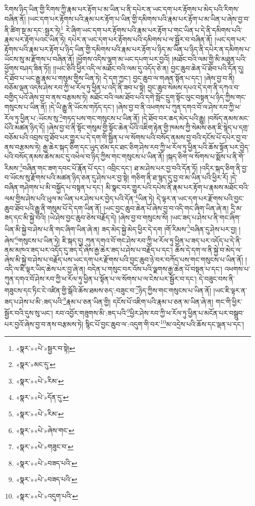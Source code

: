 རིགས་ཉིད་ཡིན་གྱི་རིགས་ཀྱི་རྣམ་པར་རྟོག་པ་མ་ཡིན་པ་ནི་དཔེར་ན་ཡང་དག་པར་རྟོགས་པ་མེད་པའི་རིགས་བཞིན་ནོ། །ཡང་དག་པར་རྟོགས་པའི་རྣམ་པར་རྟོག་པ་ཡིན་གྱི་དམིགས་པའི་རྣམ་པར་རྟོག་པ་མ་ཡིན་པ་ཞེས་བྱ་བ་ནི་ཚིག་སྔ་མ་དང་:སྦྱར་ཏེ།\footnote{«སྣར་»«པེ་»སྦྱར་བ་སྟེ།} རེ་ཞིག་ཡང་དག་པར་རྟོགས་པའི་རྣམ་པར་རྟོག་པ་གང་ཡིན་པ་དེ་ནི་དམིགས་པའི་རྣམ་པར་རྟོག་པའང་ཡིན་ཏེ། དཔེར་ན་ཡང་དག་པར་རྟོགས་པའི་དམིགས་པ་ལ་སྦྱོར་བ་བཞིན་ནོ། །ཡང་དག་པར་རྟོགས་པའི་རྣམ་པར་རྟོག་པ་ཉིད་ཡིན་གྱི་དམིགས་པའི་རྣམ་པར་རྟོག་པ་ཉིད་མ་ཡིན་པ་ཉིད་ནི་དཔེར་ན་དམིགས་པ་ཡོངས་སུ་མ་རྫོགས་པ་བཞིན་ནོ། །ཕྱོགས་འདིས་ལྷག་མ་ཡང་དཔག་པར་བྱའོ། །མཐོང་བའི་ལམ་གྱི་མི་མཐུན་པའི་ཕྱོགས་བཤད་ཟིན་ཏོ།། །།ཡང་ཅིའི་ཕྱིར་འདི་ལ་མཐོང་བའི་ལམ་དུ་འདོད་ཅེ་ན། བྱང་ཆུབ་ཆེན་པོ་ཐོབ་པའི་དོན་དུ། དེ་ཐོབ་པ་ཡང་རྒྱུ་རྣམ་པ་གསུམ་གྱིས་ཡིན་ཏེ། དེ་དག་ཀྱང་། བྱང་ཆུབ་ལ་གཞན་སྟོན་པ་དང་། །ཞེས་བྱ་བ་ནི། བཅོམ་ལྡན་འདས་ཤེས་རབ་ཀྱི་ཕ་རོལ་ཏུ་ཕྱིན་པ་འདི་ནི་ཟབ་པ་སྟེ། བྱང་ཆུབ་སེམས་དཔའ་དེ་དག་ནི་དཀའ་བ་བགྱིད་པའོ་ཞེས་བྱ་བ་ནས་བརྩམས་ཏེ། མཐོང་བའི་ལམ་ཐོབ་པའི་དགེ་སློང་དྲུག་སྟོང་ལུང་བསྟན་པ་ཉིད་ཀྱིས་གང་གསུངས་པ་ཡིན་ནོ། །དེ་ཡི་རྒྱུ་ནི་ཡོངས་གཏོད་དང་། །ཞེས་བྱ་བ་ནི་འཕགས་པ་ཀུན་དགའ་བོ་ལ་ཤེས་རབ་ཀྱི་ཕ་རོལ་ཏུ་ཕྱིན་པ་:ཡོངས་སུ་\footnote{«སྣར་»མང་དུ་}གཏད་པས་གང་གསུངས་པ་ཡིན་ནོ། །དེ་ཐོབ་བར་ཆད་མེད་པའི་རྒྱུ། །བསོད་ནམས་མང་པོའི་མཚན་ཉིད་དོ། །ཞེས་བྱ་བ་ནི་སྟོང་གསུམ་གྱི་སྟོང་ཆེན་པོའི་འཇིག་རྟེན་གྱི་ཁམས་ཀྱི་སེམས་ཅན་ཇི་སྙེད་པ་དགྲ་བཅོམ་པའི་འབྲས་བུ་ཐོབ་པར་གྱུར་པ་དེ་དག་གི་སྦྱིན་པ་ལ་སོགས་པའི་བསོད་ནམས་བྱ་བའི་དངོས་པོ་དཔེར་བྱ་བ་ནས་བརྩམས་ཏེ། རྒྱ་ཆེར་སྐད་ཅིག་དང་ཡུད་ཙམ་དང་ཐང་ཅིག་ཤེས་རབ་ཀྱི་ཕ་རོལ་ཏུ་ཕྱིན་པའི་ཆོས་སྟོན་པར་བྱེད་པའི་བསོད་ནམས་ཆེས་མང་དུ་འཕེལ་བ་ཉིད་ཀྱིས་གང་གསུངས་པ་ཡིན་ནོ། །སྐད་ཅིག་ལ་སོགས་པ་སྨོས་པ་ནི་གོ་རིམས་\footnote{«སྣར་»«པེ་»རིམ་}བཞིན་གང་ཟག་དབང་པོ་རྣོན་པོ་དང་། འབྲིང་དང་། ཐ་མ་ཤེས་པར་བྱ་བའི་དོན་ཏོ། །འདིར་སྐད་ཅིག་ནི་བྱ་བ་ཡོངས་སུ་རྫོགས་པའི་མཚན་ཉིད་ཅན་དུ་ཤེས་པར་བྱ་སྟེ། གཅིག་ནི་ཐ་སྙད་དུ་བྱ་བ་མ་ཡིན་པའི་ཕྱིར་རོ། །དེ་བཞིན་གཤེགས་པ་མི་བསྐྱོད་པ་བསྟན་པ་དང་། མི་སྣང་བར་གྱུར་པའི་དཔེས་ནི་རྣམ་པར་རྟོག་པ་རྣམས་མཐོང་བའི་ལམ་གྱིས་ཤེས་པའི་ཡུལ་མ་ཡིན་པར་ཤེས་པར་བྱེད་པའི་དོན་\footnote{«སྣར་»«པེ་»དོན་དུ་}ཡིན་ཏེ། དེ་ལྟར་ན་ཡང་དག་པར་རྫོགས་པའི་བྱང་ཆུབ་ཐོབ་པའི་རྒྱུ་ནི་གསུམ་པོ་དེ་དག་ཡིན་ནོ། །ཡང་བྱང་ཆུབ་ཆེན་པོ་ཞེས་བྱ་བ་འདི་གང་ཞིག་ཡིན་ཞེ་ན། དྲི་མ་ཟད་དང་མི་སྐྱེ་བའི། །ཡེ་ཤེས་བྱང་ཆུབ་ཅེས་བརྗོད་དེ། །ཞེས་བྱ་བ་གསུངས་སོ། །ཡང་ཟད་པ་ཤེས་པ་ནི་གང་ཞིག་ཡིན་མི་སྐྱེ་བ་ཤེས་པ་ནི་གང་ཞིག་ཡིན་ཞེ་ན། ཟད་མེད་སྐྱེ་མེད་ཕྱིར་དེ་དག །གོ་རིམས་\footnote{«སྣར་»«པེ་»རིམ་}བཞིན་དུ་ཤེས་པར་བྱ། །ཞེས་\footnote{«སྣར་»«པེ་»ཞེས་གང་}གསུངས་པ་ཡིན་ཏེ། ཇི་སྐད་དུ། ཀུན་དགའ་བོ་གང་ཤེས་རབ་ཀྱི་ཕ་རོལ་ཏུ་ཕྱིན་པ་ཟད་པར་འདོད་པ་དེ་ནི་ནམ་མཁའ་ཟད་པར་འདོད་དུ་ཟད་དེ་ཞེས་རྒྱ་ཆེར་ཟད་པ་ཤེས་པ་བརྗོད་པ་དང་། ཆོས་དེ་དག་ལ་ནི་སྐྱེ་བ་མེད་ལ་ཞེས་མི་སྐྱེ་བ་ཤེས་པ་བརྗོད་པས་ཡང་དག་པར་རྫོགས་པའི་བྱང་ཆུབ་ཉེ་བར་བཀོད་པས་གང་གསུངས་པ་ཡིན་ནོ། །འདི་ལ་ཇི་ལྟར་ཡིད་ཆེས་པར་བྱ་ཞེ་ན། བདེན་པ་གསུང་བར་འོས་པའི་ལྗགས་རྒྱ་ཆེན་པོ་བསྟན་པ་དང་། འཕགས་པ་ཀུན་དགའ་བོ་ཤེས་རབ་ཀྱི་ཕ་རོལ་ཏུ་ཕྱིན་པ་སྟོན་པ་ལ་སོགས་པ་ལ་ངེས་པར་སྦྱོར་བ་དང་། དེ་བཟུང་བས་ནི་གཟུངས་དང་ཏིང་ངེ་འཛིན་གྱི་སྒོའི་ཆོས་ཐམས་ཅད་:བཟུང་བ་\footnote{«སྣར་»«པེ་»གཟུང་བ་}ཉིད་ཀྱིས་གང་གསུངས་པ་ཡིན་ནོ། །ཡང་ཇི་ལྟར་ན་ཟད་པ་ཤེས་པ་མི་:ཟད་པའི་\footnote{«སྣར་»«པེ་»བཟད་པའི་}རྣམ་པ་ཅན་ཡིན་གྱི། དངོས་པོ་འཇིག་པའི་རྣམ་པ་ཅན་མ་ཡིན་ཞེ་ན། གང་གི་ཕྱིར་སྦྱོར་བའི་དུས་སུ་ཡང་། རབ་འབྱོར་གཟུགས་མི་:ཟད་པའི་\footnote{«སྣར་»«པེ་»བཟད་པའི་}ཕྱིར་ཤེས་རབ་ཀྱི་ཕ་རོལ་ཏུ་ཕྱིན་པ་མངོན་པར་བསྒྲུབ་པར་བྱའོ་ཞེས་བྱ་བ་ནས་བརྩམས་ཏེ། སྙིང་པོ་བྱང་ཆུབ་ལ་:འདུག་གི་བར་\footnote{«སྣར་»«པེ་»འདུག་པའི་}མ་འདྲེས་པའི་ཆོས་དང་ལྡན་པ་དང་། 